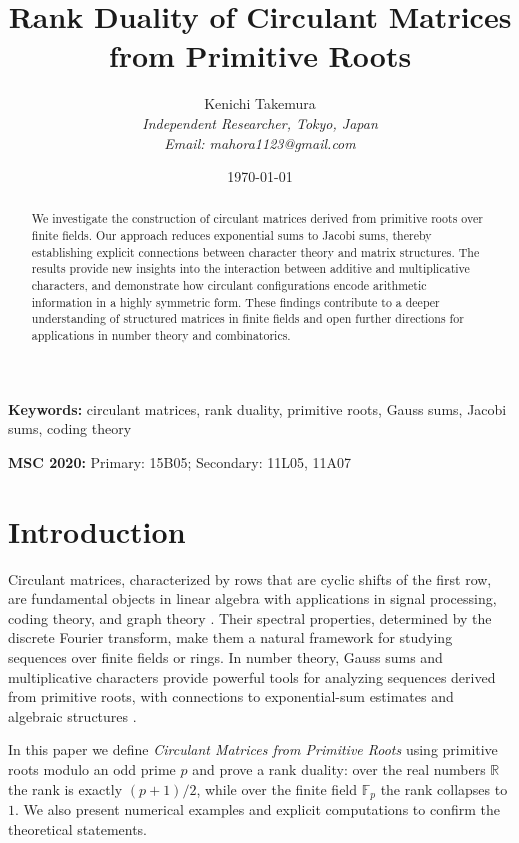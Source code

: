 \documentclass[11pt,a4paper]{article}
\title{Rank Duality of Circulant Matrices from Primitive Roots}
\author{Kenichi Takemura\\
\textit{Independent Researcher, Tokyo, Japan }\\
\textit{Email: mahora1123@gmail.com}\\
}
\date{\today}
\theoremstyle{plain}
\theoremstyle{definition}
\begin{document}
\maketitle

\begin{abstract}
We investigate the construction of circulant matrices derived from primitive roots over finite fields. Our approach reduces exponential sums to Jacobi sums, thereby establishing explicit connections between character theory and matrix structures. The results provide new insights into the interaction between additive and multiplicative characters, and demonstrate how circulant configurations encode arithmetic information in a highly symmetric form. These findings contribute to a deeper understanding of structured matrices in finite fields and open further directions for applications in number theory and combinatorics.
\end{abstract}

\vspace{1em}
\noindent \textbf{Keywords:} circulant matrices, rank duality, primitive roots, Gauss sums, Jacobi sums, coding theory

\vspace{0.5em}
\noindent \textbf{MSC 2020:} Primary: 15B05; Secondary: 11L05, 11A07

\section{Introduction}
Circulant matrices, characterized by rows that are cyclic shifts of the first row, are fundamental objects in linear algebra with applications in signal processing, coding theory, and graph theory \cite{Davis, Gray}. Their spectral properties, determined by the discrete Fourier transform, make them a natural framework for studying sequences over finite fields or rings. In number theory, Gauss sums and multiplicative characters provide powerful tools for analyzing sequences derived from primitive roots, with connections to exponential-sum estimates and algebraic structures \cite{Davenport, LN, Berndt}.

In this paper we define \emph{Circulant Matrices from Primitive Roots} using primitive roots modulo an odd prime $p$ and prove a rank duality: over the real numbers $\mathbb{R}$ the rank is exactly $(p+1)/2$, while over the finite field $\mathbb{F}_p$ the rank collapses to $1$. We also present numerical examples and explicit computations to confirm the theoretical statements.
\end{document}
